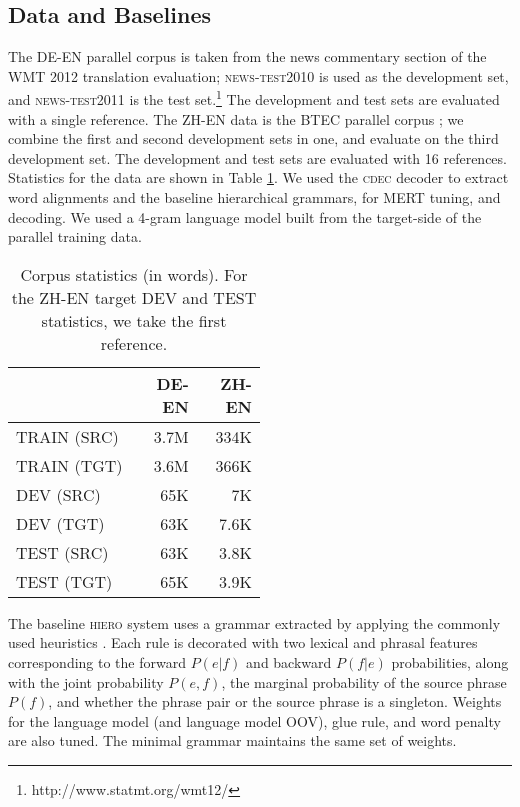 \documentclass[11pt]{article}
\begin{document}
\subsection{Data and Baselines}
\label{sec:data}
The \textsc{DE-EN} parallel corpus is taken from the news commentary section of the WMT 2012 translation evaluation; \textsc{news-test2010} is used as the development set, and \textsc{news-test2011} is the test set.\footnote{http://www.statmt.org/wmt12/}
The development and test sets are evaluated with a single reference.    
The \textsc{ZH-EN} data is the BTEC parallel corpus \cite{Paul2009}; we combine the first and second development sets in one, and evaluate on the third development set.   
The development and test sets are evaluated with 16 references.  
Statistics for the data are shown in Table \ref{tab:corpusstats}.  
We used the \textsc{cdec} decoder \cite{Dyer2010} to extract word alignments and the baseline hierarchical grammars, for MERT tuning, and decoding.  
We used a 4-gram language model built from the target-side of the parallel training data.  
\begin{table}[h!]
  \begin{center}
    \begin{tabular}{p{0.5\linewidth}rr}
      \hline
      & \textsc{DE-EN} & \textsc{ZH-EN} \\
	  \hline
      TRAIN (SRC) & 3.7M & 334K \\
	  TRAIN (TGT) & 3.6M &  366K \\
	  DEV (SRC) & 65K & 7K \\
      DEV (TGT) & 63K &  7.6K\\
	  TEST (SRC) & 63K &  3.8K \\
	  TEST (TGT) & 65K & 3.9K \\
	\end{tabular}
  \end{center}
  \caption{Corpus statistics (in words).  For the \textsc{ZH-EN} target DEV and TEST statistics, we take the first reference.}
  \label{tab:corpusstats}
\end{table}

The baseline \textsc{hiero} system uses a grammar extracted by applying the commonly used heuristics \cite{Chiang2005}.  
Each rule is decorated with two lexical and phrasal features corresponding to the forward $P(e|f)$ and backward $P(f|e)$ probabilities, along with the joint probability $P(e,f)$, the marginal probability of the source phrase $P(f)$, and whether the phrase pair or the source phrase is a singleton. 
Weights for the language model (and language model OOV), glue rule, and word penalty are also tuned. 
The minimal grammar maintains the same set of weights. 
\end{document}
